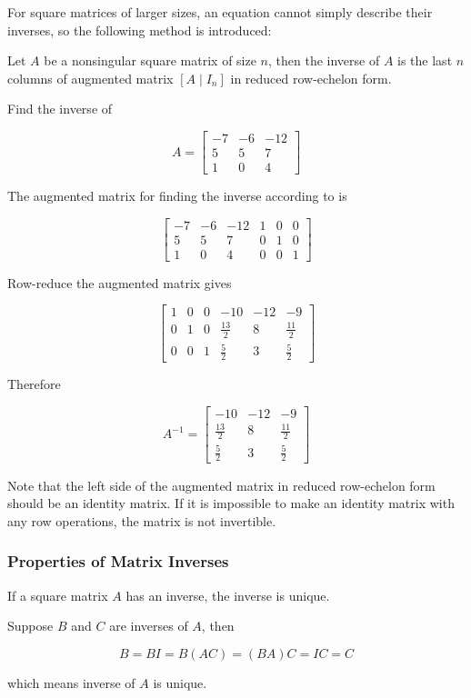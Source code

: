 \documentclass[a4paper,12pt]{article}
\begin{document}
For square matrices of larger sizes, an equation cannot simply describe their inverses, so the following method is introduced:

\begin{thm}
  Let $A$ be a nonsingular square matrix of size $n$, then the inverse of $A$ is the last $n$ columns of augmented matrix $[A\!\mid\!I_{n}]$ in reduced row-echelon form.
\end{thm}\n

\begin{exm}
  Find the inverse of

  $$A=\begin{bmatrix}
    -7 & -6 & -12\\
    5 & 5 & 7\\
    1 & 0 & 4
  \end{bmatrix}$$\s

  The augmented matrix for finding the inverse according to \rthm[\sctd{1}] is

  $$\begin{bmatrix}
    -7 & -6 & -12 & 1 & 0 & 0\\
    5 & 5 & 7 & 0 & 1 & 0\\
    1 & 0 & 4 & 0 & 0 & 1
  \end{bmatrix}$$\s

  Row-reduce the augmented matrix gives

  $$\begin{bmatrix}
    1 & 0 & 0 & -10 & -12 & -9\\
    0 & 1 & 0 & \frac{13}{2} & 8 & \frac{11}{2}\\
    0 & 0 & 1 & \frac{5}{2} & 3 & \frac{5}{2}
  \end{bmatrix}$$\s

  Therefore

  $$A^{-1}=\begin{bmatrix}
    -10 & -12 & -9\\
    \frac{13}{2} & 8 & \frac{11}{2}\\
    \frac{5}{2} & 3 & \frac{5}{2}
  \end{bmatrix}$$
\end{exm}\n

Note that the left side of the augmented matrix in reduced row-echelon form should be an identity matrix. If it is impossible to make an identity matrix with any row operations, the matrix is not invertible.

\subsubsection{Properties of Matrix Inverses}
\begin{pst}
  If a square matrix $A$ has an inverse, the inverse is unique.\n

  \prf Suppose $B$ and $C$ are inverses of $A$, then

  $$B=BI=B(AC)=(BA)C=IC=C$$\s

  which means inverse of $A$ is unique.
\end{pst}\n
\end{document}
